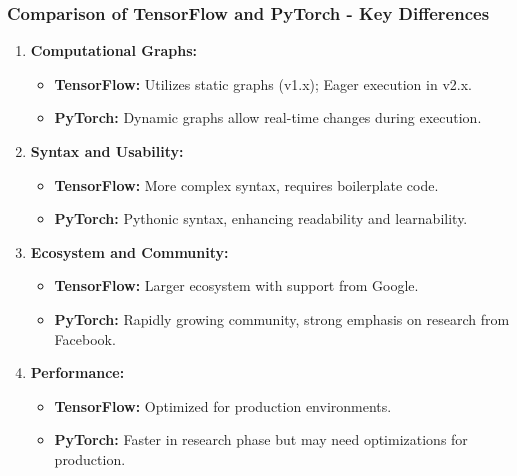 \documentclass[aspectratio=169]{beamer}
\begin{document}
\begin{frame}[fragile]
    \frametitle{Comparison of TensorFlow and PyTorch - Key Differences}
    \begin{enumerate}
        \item \textbf{Computational Graphs:}
            \begin{itemize}
                \item \textbf{TensorFlow:} Utilizes static graphs (v1.x); Eager execution in v2.x.
                \item \textbf{PyTorch:} Dynamic graphs allow real-time changes during execution.
            \end{itemize}
        
        \item \textbf{Syntax and Usability:}
            \begin{itemize}
                \item \textbf{TensorFlow:} More complex syntax, requires boilerplate code.
                \item \textbf{PyTorch:} Pythonic syntax, enhancing readability and learnability.
            \end{itemize}
        
        \item \textbf{Ecosystem and Community:}
            \begin{itemize}
                \item \textbf{TensorFlow:} Larger ecosystem with support from Google.
                \item \textbf{PyTorch:} Rapidly growing community, strong emphasis on research from Facebook.
            \end{itemize}
        
        \item \textbf{Performance:}
            \begin{itemize}
                \item \textbf{TensorFlow:} Optimized for production environments.
                \item \textbf{PyTorch:} Faster in research phase but may need optimizations for production.
            \end{itemize}
    \end{enumerate}
\end{frame}
\end{document}
